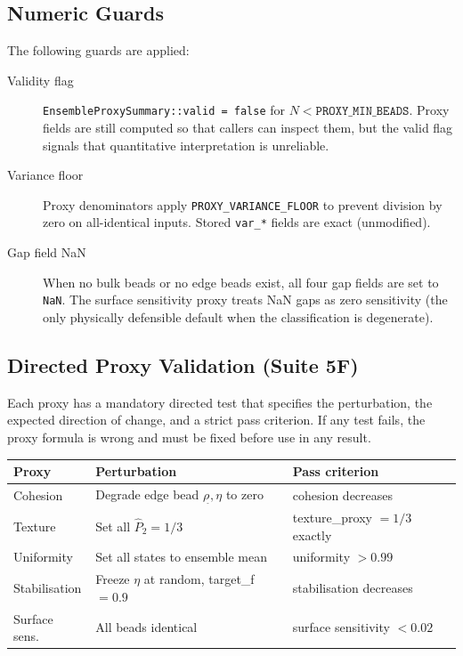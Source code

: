 \documentclass[11pt]{article}
\begin{document}
\subsection{Numeric Guards}

The following guards are applied:
\begin{description}
  \item[Validity flag]
    \texttt{EnsembleProxySummary::valid = false} for $N < \texttt{PROXY\_MIN\_BEADS}$.
    Proxy fields are still computed so that callers can inspect them,
    but the valid flag signals that quantitative interpretation is unreliable.

  \item[Variance floor]
    Proxy denominators apply \texttt{PROXY\_VARIANCE\_FLOOR} to prevent
    division by zero on all-identical inputs.
    Stored \texttt{var\_*} fields are exact (unmodified).

  \item[Gap field NaN]
    When no bulk beads or no edge beads exist, all four gap fields
    are set to \texttt{NaN}.  The surface sensitivity proxy treats NaN
    gaps as zero sensitivity (the only physically defensible default
    when the classification is degenerate).
\end{description}

\subsection{Directed Proxy Validation (Suite 5F)}

Each proxy has a mandatory directed test that specifies the perturbation,
the expected direction of change, and a strict pass criterion.
If any test fails, the proxy formula is wrong and must be fixed before
use in any result.

\begin{center}
\begin{tabular}{lll}
\textbf{Proxy} & \textbf{Perturbation} & \textbf{Pass criterion} \\
\hline
Cohesion & Degrade edge bead $\rho_\hat{}, \eta$ to zero & cohesion decreases \\
Texture & Set all $\hat{P}_2 = 1/3$ & texture\_proxy $= 1/3$ exactly \\
Uniformity & Set all states to ensemble mean & uniformity $> 0.99$ \\
Stabilisation & Freeze $\eta$ at random, target\_f$=0.9$ & stabilisation decreases \\
Surface sens. & All beads identical & surface sensitivity $< 0.02$ \\
\end{tabular}
\end{center}
\end{document}
